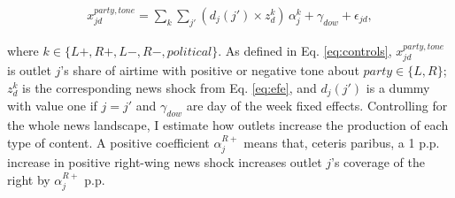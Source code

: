 \documentclass[12pt]{article}
\begin{document}

\begin{equation}\label{eq:first_stage}
	\begin{aligned}
		x^{party, tone}_{jd} =	\sum_{k} \sum_{j'}
		\left(d_j(j') \times z^{k}_d\right)\,\alpha_{j}^{k}
		+ \gamma_{dow}+\epsilon_{jd},
	\end{aligned}
\end{equation}

where $k \in\{L+,R+,L-,R-, political\}$. As defined in Eq. \eqref{eq:controls},  $x^{party, tone}_{jd}$ is outlet $j$’s share of airtime with positive or negative tone about $party \in \{L,R\}$;  $z^{k}_d$ is the corresponding news shock from Eq. \eqref{eq:efe}, and $d_j(j')$ is a dummy with value one if $j=j'$ and $\gamma_{dow}$ are day of the week fixed effects.  Controlling for the whole news landscape, I estimate how outlets increase the production of each type of content.
A positive coefficient $\alpha_{j}^{R+}$ means that, ceteris paribus, a 1 p.p. increase in  positive right-wing news shock increases outlet $j$’s coverage of the right by $\alpha_{j}^{R+}$ p.p.
\end{document}
